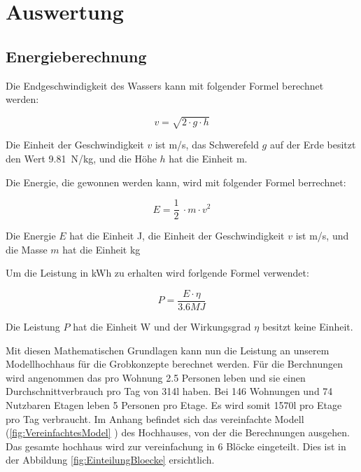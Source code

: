 \section{Auswertung} \label{sec:auswertung}



\subsection{Energieberechnung} \label{subsec:energieberechnung}

Die Endgeschwindigkeit des Wassers kann mit folgender Formel berechnet werden:
\begin{center}
\[
	v = \sqrt{2 \cdot g \cdot h}
\]
\end{center}

Die Einheit der Geschwindigkeit \(v\) ist \si{m/s}, das Schwerefeld \(g\) auf der Erde besitzt den Wert 9.81~\si{N/kg}, und die Höhe \(h\) hat die Einheit \si{m}.

\bigskip

Die Energie, die gewonnen werden kann, wird mit folgender Formel berrechnet:

\begin{center}
\[
	E =\frac 12\ \cdot m \cdot v^2
\]
\end{center}

Die Energie \(E\) hat die Einheit \si{J}, die Einheit der Geschwindigkeit \(v\) ist \si{m/s}, und die Masse \(m\) hat die Einheit \si{kg}

\bigskip

Um die Leistung in \si{kWh} zu erhalten wird forlgende Formel verwendet:

\begin{center}
\[
	P = \frac{E \cdot \eta}{3.6\si{MJ}}
\]
\end{center}

Die Leistung \(P\) hat die Einheit \si{W} und der Wirkungsgrad \(\eta\) besitzt keine Einheit.

\newpage

Mit diesen Mathematischen Grundlagen kann nun die Leistung an unserem Modellhochhaus für die Grobkonzepte berechnet werden. Für die Berchnungen wird angenommen das pro Wohnung 2.5 Personen leben und sie einen Durchschnittverbrauch pro Tag von 314\si{l} haben. Bei 146 Wohnungen und 74 Nutzbaren Etagen leben 5 Personen pro Etage. Es wird somit 1570\si{l} pro Etage pro Tag verbraucht. Im Anhang befindet sich das vereinfachte Modell (\ref{fig:VereinfachtesModel} ) des Hochhauses, von der die Berechnungen ausgehen. Das gesamte hochhaus wird zur vereinfachung in 6 Blöcke eingeteilt. Dies ist in der Abbildung \ref{fig:EinteilungBloecke}  ersichtlich.

